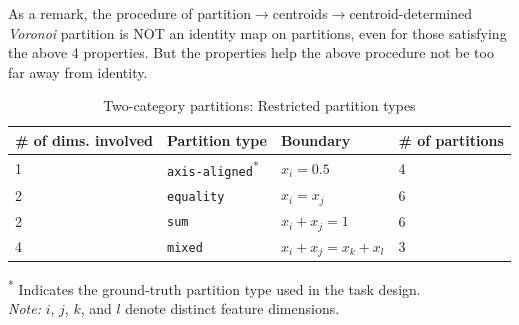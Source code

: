 As a remark, the procedure of partition$\rightarrow$centroids$\rightarrow$centroid-determined \textit{Voronoi} partition
is NOT an identity map on partitions, even for those satisfying the above 4 properties. But the properties help the above procedure not be too far away from identity.

\begin{table}[H]
\centering
\begin{threeparttable}
\caption{Two-category partitions: Restricted partition types}
\begin{tabularx}{\textwidth}{X p{3cm} p{3.5cm} p{2.5cm}}
\toprule
\textbf{\# of dims. involved} & \textbf{Partition type} & \textbf{Boundary} & \textbf{\# of partitions} \\
\midrule
1 & \texttt{axis-aligned}\textsuperscript{*} & $x_i = 0.5$ & 4\\
2 & \texttt{equality} & $x_i = x_j$ & 6\\
2 & \texttt{sum} & $x_i + x_j = 1$ & 6 \\
4 & \texttt{mixed} & $x_i + x_j = x_k + x_l$  & 3\\
\bottomrule
\end{tabularx}
\begin{tablenotes}
\footnotesize
\textsuperscript{*} Indicates the ground-truth partition type used in the task design.\\
\textit{Note:} $i$, $j$, $k$, and $l$ denote distinct feature dimensions.
\end{tablenotes}
\label{tab:2}
\end{threeparttable}
\end{table}


